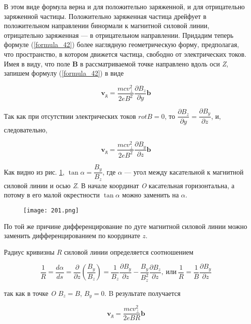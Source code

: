 В этом виде формула верна и для положительно заряженной, и для отрицательно заряженной частицы. Положительно заряженная частица дрейфует в положительном направлении бинормали к магнитной силовой линии, отрицательно заряженная — в отрицательном направлении.
Придадим теперь формуле (\ref{formula_42}) более наглядную геометрическую форму, предполагая, что пространство, в котором движется частица, свободно от электрических токов. 
Имея в виду, что поле \textbf{B} в рассматриваемой точке направлено вдоль оси \textit{Z}, запишем формулу (\ref{formula_42}) в виде

\begin{equation*}
    \textbf{v}_д = \dfrac{mcv^2_{\perp}}{2eB^2} \dfrac{\partial B_z}{\partial y} \textbf{b}
\end{equation*}

Так как при отсутствии электрических токов $rot B = 0$, то $\dfrac{\partial B_z}{\partial y} = \dfrac{\partial B_y}{\partial z}$, и, следовательно,

\begin{equation*}
    \textbf{v}_д = \dfrac{mcv^2_{\perp}}{2eB^2} \dfrac{\partial B_y}{\partial z} \textbf{b}
\end{equation*}

Как видно из рис. \ref{pic201}, $\tan \alpha = \dfrac{B_y}{B_z}$, где $\alpha$ — угол между касательной к магнитной силовой линии и осью \textit{Z}. 
В начале координат \textit{O} касательная горизонтальна, а потому в его малой окрестности $\tan \alpha$ можно заменить на $\alpha$. 

\begin{figure}
    \texttt{[image: 201.png]}
    \centering
    \caption{}
    \label{pic201}
\end{figure}

По той же причине дифференцирование по дуге магнитной силовой линии можно заменить дифференцированием по координате $z$.

Радиус кривизны $R$ силовой линии определяется соотношением

\begin{equation*}
    \dfrac{1}{R} = \dfrac{d\alpha}{ds} = \dfrac{\partial}{\partial z} \left( \dfrac{B_y}{B_z} \right) = \dfrac{1}{B_z} \dfrac{\partial B_y}{\partial z} - \dfrac{B_y}{B_z^2} \dfrac{\partial B_z}{\partial z}, ~\text{или}~ \dfrac{1}{R} = \dfrac{1}{B} \dfrac{\partial B_y}{\partial z}
\end{equation*}

так как в точке \textit{O} $B_z = B$, $B_y = 0$. B результате получается

\begin{equation}
    \label{formula_43}
    \textbf{v}_д = \dfrac{mcv^2_{\perp}}{2eBR} \textbf{b}
\end{equation}
